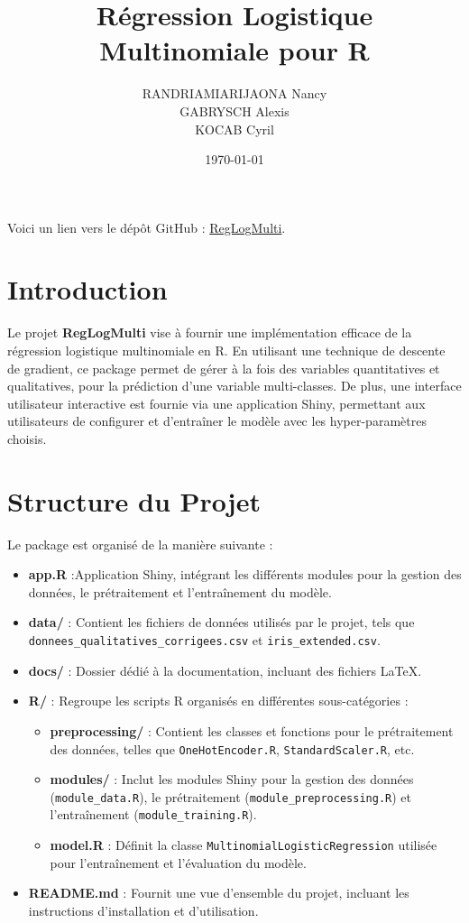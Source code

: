 \documentclass[a4paper,12pt]{article}
\title{Régression Logistique Multinomiale pour R}
\author{RANDRIAMIARIJAONA Nancy \\GABRYSCH Alexis\\KOCAB Cyril}
\date{\today}
\begin{document}
\maketitle
Voici un lien vers le dépôt GitHub :  
\href{https://github.com/Cyr-CK/RegLogMulti}{RegLogMulti}.
\tableofcontents

\newpage

\section{Introduction}

Le projet \textbf{RegLogMulti} vise à fournir une implémentation efficace de la régression logistique multinomiale en R. En utilisant une technique de descente de gradient, ce package permet de gérer à la fois des variables quantitatives et qualitatives, pour la prédiction d'une variable multi-classes. De plus, une interface utilisateur interactive est fournie via une application Shiny, permettant aux utilisateurs de configurer et d’entraîner le modèle avec les hyper-paramètres choisis.

\section{Structure du Projet}

Le package est organisé de la manière suivante : \\

\begin{itemize}

    \item \textbf{app.R} :Application Shiny, intégrant les différents modules pour la gestion des données, le prétraitement et l'entraînement du modèle.
    \item \textbf{data/} : Contient les fichiers de données utilisés par le projet, tels que \\\texttt{donnees\_qualitatives\_corrigees.csv} et \texttt{iris\_extended.csv}.
    \item \textbf{docs/} : Dossier dédié à la documentation, incluant des fichiers LaTeX.
    \item \textbf{R/} : Regroupe les scripts R organisés en différentes sous-catégories :
    \begin{itemize}
        \item \textbf{preprocessing/} : Contient les classes et fonctions pour le prétraitement des données, telles que \texttt{OneHotEncoder.R}, \texttt{StandardScaler.R}, etc.
        \item \textbf{modules/} : Inclut les modules Shiny pour la gestion des données (\texttt{module\_data.R}), le prétraitement (\texttt{module\_preprocessing.R}) et l'entraînement (\texttt{module\_training.R}).
        \item \textbf{model.R} : Définit la classe \texttt{MultinomialLogisticRegression} utilisée pour l'entraînement et l'évaluation du modèle.
    \end{itemize}
    \item \textbf{README.md} : Fournit une vue d'ensemble du projet, incluant les instructions d'installation et d'utilisation.
\end{itemize}
\end{document}
